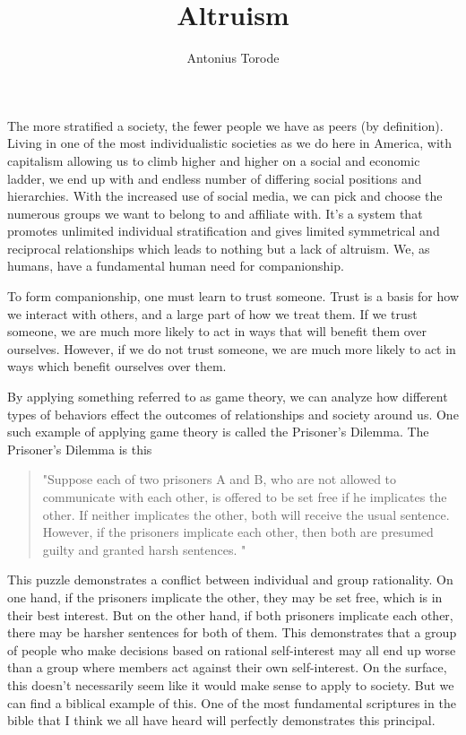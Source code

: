 \documentclass[10pt]{article}
\title{Altruism}
\author{Antonius Torode}
\begin{document}
\maketitle
\thispagestyle{fancy}

\begin{multicols}{2}

The more stratified a society, the fewer people we have as peers (by definition). Living in one of the most individualistic societies as we do here in America, with capitalism allowing us to climb higher and higher on a social and economic ladder, we end up with and endless number of differing social positions and hierarchies. With the increased use of social media, we can pick and choose the numerous groups we want to belong to and affiliate with. It's a system that promotes unlimited individual stratification and gives limited symmetrical and reciprocal relationships which leads to nothing but a lack of altruism. We, as humans, have a fundamental human need for companionship.

To form companionship, one must learn to trust someone. Trust is a basis for how we interact with others, and a large part of how we treat them. If we trust someone, we are much more likely to act in ways that will benefit them over ourselves. However, if we do not trust someone, we are much more likely to act in ways which benefit ourselves over them. 

By applying something referred to as game theory, we can analyze how different types of behaviors effect the outcomes of relationships and society around us. One such example of applying game theory is called the Prisoner's Dilemma. The Prisoner's Dilemma is this

\begin{quotation}
"Suppose each of two prisoners A and B, who are not allowed to communicate with each other, is offered to be set free if he implicates the other. If neither implicates the other, both will receive the usual sentence. However, if the prisoners implicate each other, then both are presumed guilty and granted harsh sentences. \cite{Prisoners Dilemma}"
\end{quotation}

This puzzle demonstrates a conflict between individual and group rationality. On one hand, if the prisoners implicate the other, they may be set free, which is in their best interest. But on the other hand, if both prisoners implicate each other, there may be harsher sentences for both of them. This demonstrates that a group of people who make decisions based on rational self-interest may all end up worse than a group where members act against their own self-interest. On the surface, this doesn't necessarily seem like it would make sense to apply to society. But we can find a biblical example of this. One of the most fundamental scriptures in the bible that I think we all have heard will perfectly demonstrates this principal.


\end{multicols}
\end{document}

